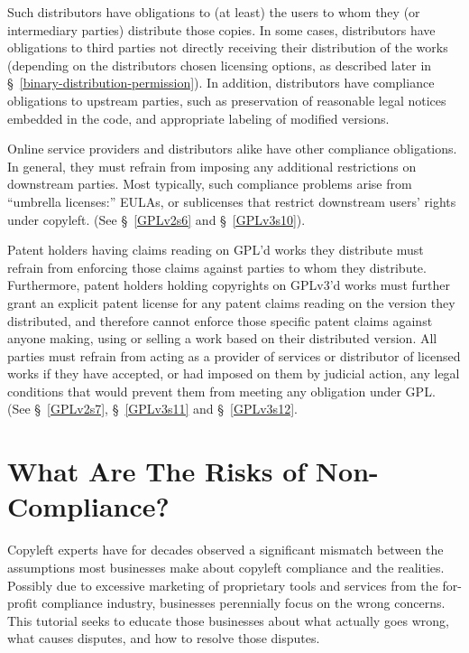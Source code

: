 Such distributors have obligations to (at least) the users to whom they (or
intermediary parties) distribute those copies.  In some cases, distributors
have obligations to third parties not directly receiving their distribution
of the works (depending on the distributors chosen licensing options, as
described later in \S~\ref{binary-distribution-permission}).  In addition,
distributors have compliance obligations to upstream parties, such as
preservation of reasonable legal notices embedded in the code, and
appropriate labeling of modified versions.

Online service providers and distributors alike have other compliance
obligations.  In general, they must refrain from imposing any additional
restrictions on downstream parties. Most typically, such compliance problems
arise from ``umbrella licenses:'' EULAs, or sublicenses that restrict
downstream users’ rights under copyleft. (See \S~\ref{GPLv2s6} and
\S~\ref{GPLv3s10}).

Patent holders having claims reading on GPL'd works they distribute must
refrain from enforcing those claims against parties to whom they distribute.
Furthermore, patent holders holding copyrights on GPLv3'd works must further
grant an explicit patent license for any patent claims reading on the version
they distributed, and therefore cannot enforce those specific patent claims
against anyone making, using or selling a work based on their distributed
version.  All parties must refrain from acting as a provider of services or
distributor of licensed works if they have accepted, or had imposed on them
by judicial action, any legal conditions that would prevent them from meeting
any obligation under GPL\@.  (See \S~\ref{GPLv2s7}, \S~\ref{GPLv3s11} and
\S~\ref{GPLv3s12}.

\section{What Are The Risks of Non-Compliance?}

Copyleft experts have for decades observed a significant mismatch between the
assumptions most businesses make about copyleft compliance and the realities.
Possibly due to excessive marketing of proprietary tools and services from
the for-profit compliance industry, businesses perennially focus on the wrong
concerns.  This tutorial seeks to educate those businesses about what
actually goes wrong, what causes disputes, and how to resolve those disputes.


